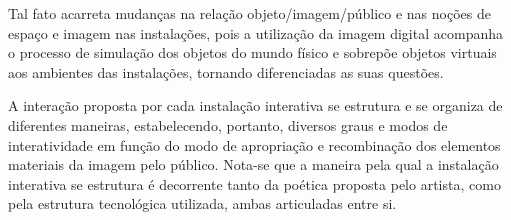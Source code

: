 Tal fato acarreta mudanças na relação objeto/imagem/público e nas noções de espaço e imagem nas instalações, pois a utilização da imagem digital acompanha o processo de simulação dos objetos do mundo físico e sobrepõe objetos virtuais aos ambientes das instalações, tornando diferenciadas as suas questões. \cite[p. 6]{bochio}

A interação proposta por cada instalação interativa se estrutura e se organiza de diferentes maneiras, estabelecendo, portanto, diversos graus e modos de interatividade em função do modo de apropriação e recombinação dos elementos materiais da imagem
pelo público. Nota-se que a maneira pela qual a instalação interativa se estrutura é decorrente tanto da poética proposta pelo artista, como pela estrutura tecnológica utilizada, ambas articuladas entre si. \cite[p. 6-7]{bochio}



